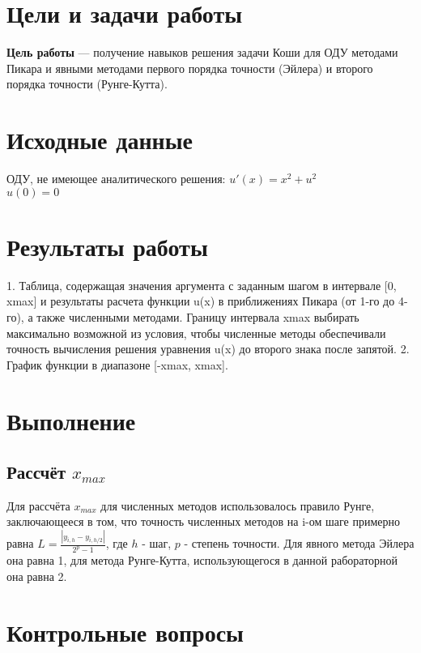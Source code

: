 \chapter{Цели и задачи работы}
\textbf{Цель работы} --- получение навыков решения задачи Коши для ОДУ методами Пикара и
явными методами первого порядка точности (Эйлера) и второго порядка точности (Рунге-Кутта).

\chapter{Исходные данные}
ОДУ, не имеющее аналитического решения:
$u'(x) = x^{2} + u^{2}$\\
$u(0) = 0$

\chapter{Результаты работы}
1. Таблица, содержащая значения аргумента с заданным шагом в интервале [0, xmax] и результаты расчета функции u(x) в приближениях Пикара (от 1-го до 4-го), а также численными методами. Границу интервала xmax выбирать максимально возможной из условия, чтобы численные методы обеспечивали точность вычисления решения уравнения u(x) до второго знака после запятой.
2. График функции в диапазоне [-xmax, xmax].

\chapter{Выполнение}
\section{Рассчёт $x_{max}$}
Для рассчёта $x_{max}$ для численных методов использовалось правило Рунге, заключающееся в том, что точность численных методов на i-ом шаге примерно равна $L = \frac{|y_{i, h} - y_{i, h/2}|}{2^{p} - 1}$, где $h$ - шаг, $p$ - степень точности. Для явного метода Эйлера она равна 1, для метода Рунге-Кутта, использующегося в данной рабораторной она равна 2.



\chapter{Контрольные вопросы}